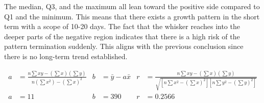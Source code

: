 \documentclass{article}
\begin{document}
\begin{figure}[h]
    \centering
\end{figure}

The median, Q3, and the maximum all lean toward the positive side compared to Q1 and the minimum. This means that there exists a growth pattern in the short term with a scope of 10-20 days. The fact that the whisker reaches into the deeper parts of the negative region indicates that there is a high risk of the pattern termination suddenly. This aligns with the previous conclusion since there is no long-term trend established.



\begin{align*}
    a&=\frac{n \sum x y-\left(\sum x\right)\left(\sum y\right)}{n\left(\sum x^2\right)-\left(\sum x\right)^2} & b&=\bar{y}-a \bar{x} & r&=\frac{n \sum x y-\left(\sum x\right)\left(\sum y\right)}{\sqrt{\left[n \sum x^2-\left(\sum x\right)^2\right]\left[n \sum y^2-\left(\sum y\right)^2\right]}}\\
    a&=11     & b&=390         & r&=0.2566
\end{align*}
\end{document}
